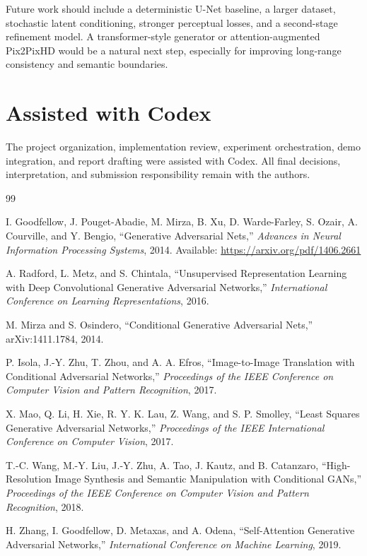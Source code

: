 \documentclass[conference]{IEEEtran}
\begin{document}
Future work should include a deterministic U-Net baseline, a larger dataset, stochastic latent conditioning, stronger perceptual losses, and a second-stage refinement model. A transformer-style generator or attention-augmented Pix2PixHD would be a natural next step, especially for improving long-range consistency and semantic boundaries.

\section*{Assisted with Codex}
The project organization, implementation review, experiment orchestration, demo integration, and report drafting were assisted with Codex. All final decisions, interpretation, and submission responsibility remain with the authors.


\begin{thebibliography}{99}

I. Goodfellow, J. Pouget-Abadie, M. Mirza, B. Xu, D. Warde-Farley, S. Ozair, A. Courville, and Y. Bengio, ``Generative Adversarial Nets,'' \emph{Advances in Neural Information Processing Systems}, 2014. Available: \url{https://arxiv.org/pdf/1406.2661}

A. Radford, L. Metz, and S. Chintala, ``Unsupervised Representation Learning with Deep Convolutional Generative Adversarial Networks,'' \emph{International Conference on Learning Representations}, 2016.

M. Mirza and S. Osindero, ``Conditional Generative Adversarial Nets,'' arXiv:1411.1784, 2014.

P. Isola, J.-Y. Zhu, T. Zhou, and A. A. Efros, ``Image-to-Image Translation with Conditional Adversarial Networks,'' \emph{Proceedings of the IEEE Conference on Computer Vision and Pattern Recognition}, 2017.

X. Mao, Q. Li, H. Xie, R. Y. K. Lau, Z. Wang, and S. P. Smolley, ``Least Squares Generative Adversarial Networks,'' \emph{Proceedings of the IEEE International Conference on Computer Vision}, 2017.

T.-C. Wang, M.-Y. Liu, J.-Y. Zhu, A. Tao, J. Kautz, and B. Catanzaro, ``High-Resolution Image Synthesis and Semantic Manipulation with Conditional GANs,'' \emph{Proceedings of the IEEE Conference on Computer Vision and Pattern Recognition}, 2018.

H. Zhang, I. Goodfellow, D. Metaxas, and A. Odena, ``Self-Attention Generative Adversarial Networks,'' \emph{International Conference on Machine Learning}, 2019.


\end{thebibliography}
\end{document}
